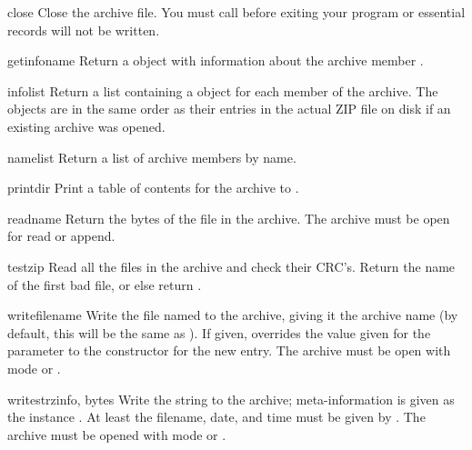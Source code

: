 \begin{methoddesc}{close}{}
  Close the archive file.  You must call  before
  exiting your program or essential records will not be written. 
\end{methoddesc}

\begin{methoddesc}{getinfo}{name}
  Return a  object with information about the archive
  member .
\end{methoddesc}

\begin{methoddesc}{infolist}{}
  Return a list containing a  object for each member of
  the archive.  The objects are in the same order as their entries in
  the actual ZIP file on disk if an existing archive was opened.
\end{methoddesc}

\begin{methoddesc}{namelist}{}
  Return a list of archive members by name.
\end{methoddesc}

\begin{methoddesc}{printdir}{}
  Print a table of contents for the archive to .
\end{methoddesc}

\begin{methoddesc}{read}{name}
  Return the bytes of the file in the archive.  The archive must be
  open for read or append.
\end{methoddesc}

\begin{methoddesc}{testzip}{}
  Read all the files in the archive and check their CRC's.  Return the
  name of the first bad file, or else return .
\end{methoddesc}

\begin{methoddesc}{write}{filename}
  Write the file named  to the archive, giving it the
  archive name  (by default, this will be the same as
  ).  If given,  overrides the value
  given for the  parameter to the constructor for
  the new entry.  The archive must be open with mode  or
  . 
\end{methoddesc}

\begin{methoddesc}{writestr}{zinfo, bytes}
  Write the string  to the archive; meta-information is
  given as the  instance .  At least the
  filename, date, and time must be given by .  The archive
  must be opened with mode  or .
\end{methoddesc}


